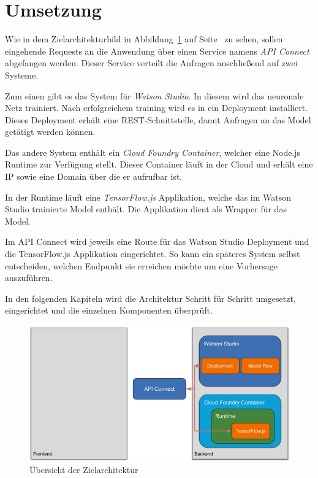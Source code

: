 \section{Umsetzung}
Wie in dem Zielarchitekturbild in Abbildung~\ref{fig:umsetzung_zielarchitektur} auf
Seite~\pageref{fig:umsetzung_zielarchitektur} zu sehen, sollen eingehende Requests an die Anwendung über einen Service
namens \textit{API Connect} abgefangen werden. Dieser Service verteilt die Anfragen anschließend auf zwei Systeme.

Zum einen gibt es das System für \textit{Watson Studio}. In diesem wird das neuronale Netz trainiert. Nach erfolgreichem
training wird es in ein Deployment installiert. Dieses Deployment erhält eine REST-Schnittstelle, damit Anfragen an das
Model getätigt werden können.

Das andere System enthält ein \textit{Cloud Foundry Container}, welcher eine Node.js Runtime zur Verfügung stellt. Dieser
Container läuft in der Cloud und erhält eine IP sowie eine Domain über die er aufrufbar ist.

In der Runtime läuft eine \textit{TensorFlow.js} Applikation, welche das im Watson Studio trainierte Model enthält. Die
Applikation dient als Wrapper für das Model.

Im API Connect wird jeweils eine Route für das Watson Studio Deployment und die TensorFlow.js Applikation
eingerichtet. So kann ein späteres System selbst entscheiden, welchen Endpunkt sie erreichen möchte um eine Vorhersage
auszuführen.

In den folgenden Kapiteln wird die Architektur Schritt für Schritt umgesetzt, eingerichtet und die einzelnen Komponenten
überprüft.

\begin{figure}[h]
    \centering
    \includegraphics[width=\textwidth]{images/kapitel_3/architektur_uebersicht.pdf}
    \caption{Übersicht der Zielarchitektur}
    \label{fig:umsetzung_zielarchitektur}
\end{figure}

